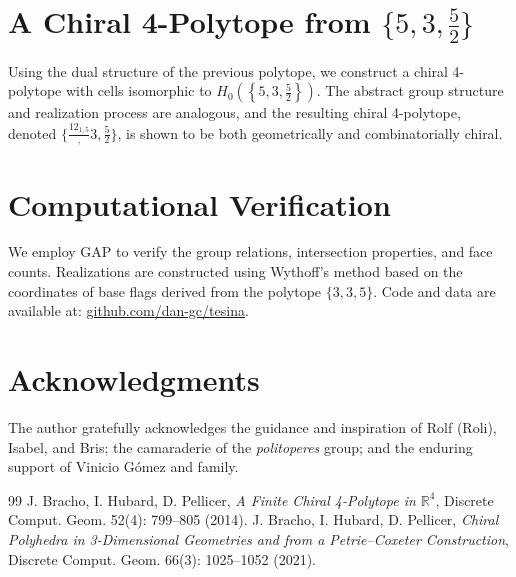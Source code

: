 \documentclass[oneside,final]{amsart}
\begin{document}
\section{A Chiral 4-Polytope from $\{5, 3, \frac{5}{2}\}$}
Using the dual structure of the previous polytope, we construct a chiral 4-polytope with cells isomorphic to $H_0\left( \left\{ 5, 3, \frac{5}{2} \right\} \right)$. The abstract group structure and realization process are analogous, and the resulting chiral 4-polytope, denoted $\{\frac{12_{1,5}}, 3, \frac{5}{2}\}$, is shown to be both geometrically and combinatorially chiral.

\section{Computational Verification}
We employ GAP to verify the group relations, intersection properties, and face counts. Realizations are constructed using Wythoff's method based on the coordinates of base flags derived from the polytope $\{3,3,5\}$. Code and data are available at: \href{https://github.com/dan-gc/tesina}{github.com/dan-gc/tesina}.

\section*{Acknowledgments}
The author gratefully acknowledges the guidance and inspiration of Rolf (Roli), Isabel, and Bris; the camaraderie of the \emph{politoperes} group; and the enduring support of Vinicio G\'omez and family.

\begin{thebibliography}{99}
 J. Bracho, I. Hubard, D. Pellicer, \emph{A Finite Chiral 4-Polytope in $\mathbb{R}^4$}, Discrete Comput. Geom. 52(4): 799--805 (2014).
 J. Bracho, I. Hubard, D. Pellicer, \emph{Chiral Polyhedra in 3-Dimensional Geometries and from a Petrie--Coxeter Construction}, Discrete Comput. Geom. 66(3): 1025--1052 (2021).
\end{thebibliography}
\end{document}
